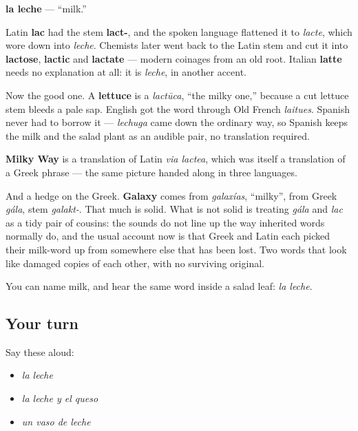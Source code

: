 \begin{cousinweb}
\textbf{la leche} — \textquotedblleft{}milk.\textquotedblright{}

Latin \textbf{lac} had the stem \textbf{lact-}, and the spoken language flattened it to \emph{lacte}, which wore down into \emph{leche}. Chemists later went back to the Latin stem and cut it into \textbf{lactose}, \textbf{lactic} and \textbf{lactate} — modern coinages from an old root. Italian \textbf{latte} needs no explanation at all: it is \emph{leche}, in another accent.

Now the good one. A \textbf{lettuce} is a \emph{lactūca}, \textquotedblleft{}the milky one,\textquotedblright{} because a cut lettuce stem bleeds a pale sap. English got the word through Old French \emph{laitues}. Spanish never had to borrow it — \emph{lechuga} came down the ordinary way, so Spanish keeps the milk and the salad plant as an audible pair, no translation required.

\textbf{Milky Way} is a translation of Latin \emph{via lactea}, which was itself a translation of a Greek phrase — the same picture handed along in three languages.

And a hedge on the Greek. \textbf{Galaxy} comes from \emph{galaxías}, \textquotedblleft{}milky\textquotedblright{}, from Greek \emph{gála}, stem \emph{galakt-}. That much is solid. What is not solid is treating \emph{gála} and \emph{lac} as a tidy pair of cousins: the sounds do not line up the way inherited words normally do, and the usual account now is that Greek and Latin each picked their milk-word up from somewhere else that has been lost. Two words that look like damaged copies of each other, with no surviving original.
\end{cousinweb}

\begin{grammarlens}[title={What you've built}]
You can name milk, and hear the same word inside a salad leaf: \emph{la leche}.
\end{grammarlens}

\subsection*{Your turn}
Say these aloud:

\begin{itemize}
\raggedright
  \item \emph{la leche}
  \item \emph{la leche y el queso}
  \item \emph{un vaso de leche}
\end{itemize}

